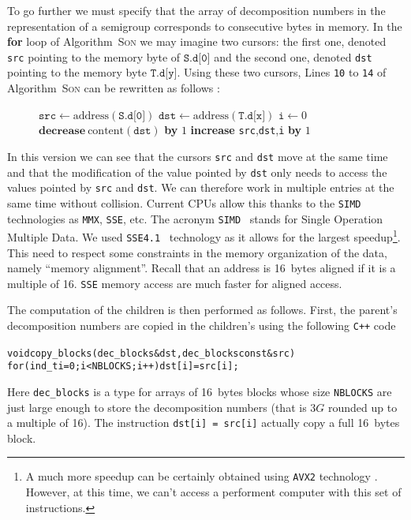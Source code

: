 \documentclass[reqno,11pt]{amsart}
\theoremstyle{plain}
\theoremstyle{definition}
\newcommand{\CPP}{\texttt{C++}\xspace}
\renewcommand{\leq}{\leqslant}
\newcommand{\MMX}{\texttt{MMX}\xspace}
\newcommand{\SIMD}{\texttt{SIMD}\xspace}
\newcommand{\SSE}{\texttt{SSE}\xspace}
\newcommand{\SSEV}{\texttt{SSE4.1}\xspace}
\renewcommand{\tt}[1]{\texttt{#1}}
\begin{document}
To go further we must specify that the array of decomposition numbers in the
representation of a semigroup corresponds to consecutive bytes in memory. In
the \textbf{for} loop of Algorithm~\textsc{Son} we may imagine two cursors:
the first one, denoted \texttt{src} pointing to the memory byte of
$\texttt{S.d[0]}$ and the second one, denoted \texttt{dst} pointing to the
memory byte $\texttt{T.d[y]}$.  Using these two cursors, Lines \tt{10} to
\tt{14} of Algorithm~\textsc{Son} can be rewritten as follows :

\begin{figure}
\small
\begin{algorithmic}
\State $\tt{src}\gets \text{address}(\tt{S.d[0]})$
\State $\tt{dst}\gets \text{address}(\tt{T.d[x]})$
\State $\tt{i}\gets 0$
\While{$\tt{i}\leq \tt{3G}-\tt{x}$}
\If{$\text{content}(\tt{src})>0$}
\State $\textbf{decrease}\ \text{content}(\tt{dst})$ \textbf{by} $1$\EndIf
\State \textbf{increase} \tt{src},\tt{dst},\tt{i} \textbf{by} $1$
\EndWhile
\end{algorithmic}
\end{figure}

\noindent In this version we can see that the cursors \texttt{src} and
\texttt{dst} move at the same time and that the modification of the value
pointed by \texttt{dst} only needs to access the values pointed by \tt{src}
and \tt{dst}.  We can therefore work in multiple entries at the same time
without collision.  Current CPUs allow this thanks to the \SIMD technologies as
\MMX, \SSE, etc.  The acronym \SIMD~\cite{WikipediaSIMD} stands for Single Operation Multiple Data.  
We used \SSEV~\cite{WikipediaSSE, IntelSSE} technology as it allows for the largest speedup\footnote{A much more speedup can be certainly obtained using \texttt{AVX2} technology \cite{AVX2}. However, at this time, we can't access a performent computer with this set of instructions.}.  
This need to respect some constraints in the memory
organization of the data, namely ``memory alignment''. Recall that an address
is 16~bytes aligned if it is a multiple of 16. \SSE memory access are much
faster for aligned access.


The computation of the children is then performed as follows. First, the
parent's decomposition numbers are copied in the children's using the
following \CPP code
{
\small
\begin{alltt}
void copy_blocks(dec_blocks &dst, dec_blocks const &src) {
  for (ind_t i=0; i<NBLOCKS; i++) dst[i] = src[i];
}
\end{alltt}}
Here \tt{dec\_blocks} is a type for arrays of 16~bytes blocks whose size
\tt{NBLOCKS} are just large enough to store the decomposition numbers (that is
$3G$ rounded up to a multiple of 16). The instruction \tt{dst[i] = src[i]}
actually copy a full 16~bytes block.
\end{document}
